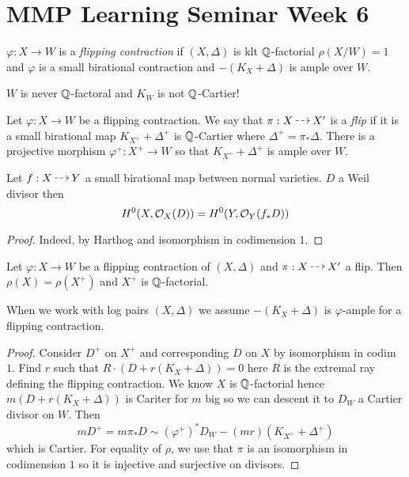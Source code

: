 \documentclass[12pt]{article}
\begin{document}
\section{MMP Learning Seminar Week 6}

\begin{defn}
$\varphi : X \to W$ is a \textit{flipping contraction} if $(X, \Delta)$ is klt $\mathbb{Q}$-factorial $\rho(X/W) = 1$ and $\varphi$ is a small birational contraction and $-(K_X + \Delta)$ is ample over $W$.
\end{defn}

\begin{rmk}
$W$ is never $\mathbb{Q}$-factoral and $K_W$ is not $\mathbb{Q}$-Cartier!
\end{rmk}

\begin{defn}
Let $\varphi : X \to W$ be a flipping contraction. We say that $\pi : X \rat X'$ is a \textit{flip} if it is a small birational map $K_{X^+} + \Delta^+$ is $\mathbb{Q}$-Cartier where $\Delta^+ = \pi_* \Delta$. There is a projective morphism $\varphi^+ : X^+ \to W$ so that $K_{X^+} + \Delta^+$ is ample over $W$.
\end{defn}

\begin{lemma}
Let $f : X \rat Y$ a small birational map between normal varieties. $D$ a Weil divisor then
\[ H^0(X, \mathcal{O}_{X}(D)) = H^0(Y, \mathcal{O}_{Y}(f_* D)) \]
\end{lemma}

\begin{proof}
Indeed, by Harthog and isomorphism in codimension $1$.
\end{proof}

\begin{lemma}
Let $\varphi : X \to W$ be a flipping contraction of $(X, \Delta)$ and $\pi : X \rat X'$ a flip. Then $\rho(X) = \rho(X^+)$ and $X^+$ is $\mathbb{Q}$-factorial.
\end{lemma}

\begin{rmk}
When we work with log pairs $(X, \Delta)$ we assume $-(K_X + \Delta)$ is $\varphi$-ample for a flipping contraction.
\end{rmk}

\begin{proof}
Consider $D^+$ on $X^+$ and corresponding $D$ on $X$ by isomorphism in codim $1$. Find $r$ such that $R \cdot (D + r (K_X + \Delta)) = 0$ here $R$ is the extremal ray defining the flipping contraction. We know $X$ is $\mathbb{Q}$-factorial hence $m(D + r(K_X + \Delta))$ is Cariter for $m$ big so we can descent it to $D_W$ a Cartier divisor on $W$. Then
\[ m D^+ = m \pi_* D \sim (\varphi^+)^* D_W - (mr) (K_{X^+} + \Delta^+) \]
which is Cartier. For equality of $\rho$, we use that $\pi$ is an isomorphism in codimension $1$ so it is injective and surjective on divisors. 
\end{proof}
\end{document}
